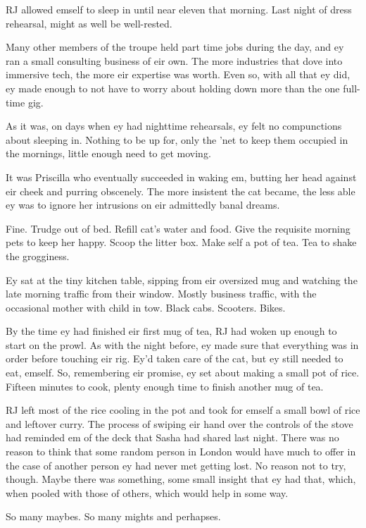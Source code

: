 RJ allowed emself to sleep in until near eleven that morning. Last night of dress rehearsal, might as well be well-rested.

Many other members of the troupe held part time jobs during the day, and ey ran a small consulting business of eir own. The more industries that dove into immersive tech, the more eir expertise was worth. Even so, with all that ey did, ey made enough to not have to worry about holding down more than the one full-time gig.

As it was, on days when ey had nighttime rehearsals, ey felt no compunctions about sleeping in. Nothing to be up for, only the 'net to keep them occupied in the mornings, little enough need to get moving.

It was Priscilla who eventually succeeded in waking em, butting her head against eir cheek and purring obscenely. The more insistent the cat became, the less able ey was to ignore her intrusions on eir admittedly banal dreams.

Fine. Trudge out of bed. Refill cat's water and food. Give the requisite morning pets to keep her happy. Scoop the litter box. Make self a pot of tea. Tea to shake the grogginess.

Ey sat at the tiny kitchen table, sipping from eir oversized mug and watching the late morning traffic from their window. Mostly business traffic, with the occasional mother with child in tow. Black cabs. Scooters. Bikes.

By the time ey had finished eir first mug of tea, RJ had woken up enough to start on the prowl. As with the night before, ey made sure that everything was in order before touching eir rig. Ey'd taken care of the cat, but ey still needed to eat, emself. So, remembering eir promise, ey set about making a small pot of rice. Fifteen minutes to cook, plenty enough time to finish another mug of tea.

RJ left most of the rice cooling in the pot and took for emself a small bowl of rice and leftover curry. The process of swiping eir hand over the controls of the stove had reminded em of the deck that Sasha had shared last night. There was no reason to think that some random person in London would have much to offer in the case of another person ey had never met getting lost. No reason not to try, though. Maybe there was something, some small insight that ey had that, which, when pooled with those of others, which would help in some way.

So many maybes. So many mights and perhapses.

